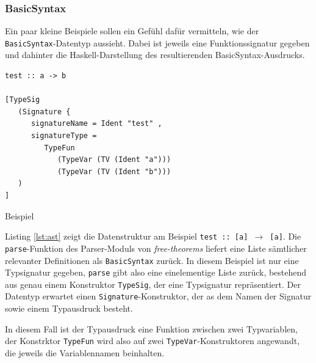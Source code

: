 

\subsubsection{BasicSyntax}

\label{sec:basic-syntax}

Ein paar kleine Beispiele sollen ein Gefühl dafür vermitteln, wie der \texttt{BasicSyntax}-Datentyp aussieht. Dabei ist jeweils
eine Funktionssignatur gegeben und dahinter die Haskell-Darstellung des resultierenden BasicSyntax-Ausdrucks.

\begin{listing}[ht]
\begin{verbatim}
test :: a -> b

[TypeSig
   (Signature {
      signatureName = Ident "test" ,
      signatureType =
         TypeFun
            (TypeVar (TV (Ident "a")))
            (TypeVar (TV (Ident "b")))
   )
]

\end{verbatim}
\caption{Beispiel}
\label{lst:ast}
\end{listing}

Listing \ref{lst:ast} zeigt die Datenstruktur am Beispiel \texttt{test :: [a] $\rightarrow$ [a]}. Die \texttt{parse}-Funktion des Parser-Moduls von \textit{free-theorems} liefert eine Liste sämtlicher relevanter Definitionen als \texttt{BasicSyntax} zurück.
In diesem Beispiel ist nur eine Typsignatur gegeben, \texttt{parse} gibt also eine einelementige Liste zurück, bestehend aus
genau einem Konstruktor \texttt{TypeSig}, der eine Typsignatur repräsentiert. Der Datentyp erwartet einen
\texttt{Signature}-Konstruktor, der as dem Namen der Signatur sowie einem Typausdruck besteht.

In diesem Fall ist der Typausdruck eine Funktion zwischen zwei Typvariablen, der Konstrktor \texttt{TypeFun} wird also
auf zwei \texttt{TypeVar}-Konstruktoren angewandt, die jeweils die Variablennamen beinhalten.

